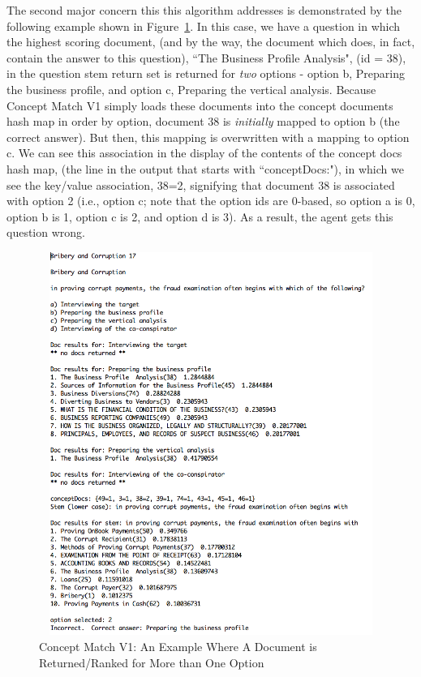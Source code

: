 The second major concern this this algorithm addresses is demonstrated by the following example shown in Figure~\ref{fig:concept_match_v1_wrong_option_doc}.  In this case, we have a question in which the highest scoring document, (and by the way, the document which does, in fact, contain the answer to this question), ``The Business Profile Analysis", (id = 38), in the question stem return set is returned for \emph{two} options - option b, Preparing the business profile, and option c,  Preparing the vertical analysis.  Because Concept Match V1 simply loads these documents into the concept documents hash map in order by option, document 38 is \emph{initially} mapped to option b (the correct answer).  But then, this mapping is overwritten with a mapping to option c.  We can see this association in the display of the contents of the concept docs hash map, (the line in the output that starts with ``conceptDocs:"), in which we see the key/value association, 38=2, signifying that document 38 is associated with option 2 (i.e., option c; note that the option ids are 0-based, so option a is 0, option b is 1, option c is 2, and option d is 3).  As a result, the agent gets this question wrong.

\begin{figure}
\centering
\vspace{1.0in}
\includegraphics[width=125mm, height=125mm]{concept_match_v1_wrong_option_doc.png}
\caption{Concept Match V1: An Example Where A Document is Returned/Ranked for More than One Option}
\label{fig:concept_match_v1_wrong_option_doc}
\end{figure}

